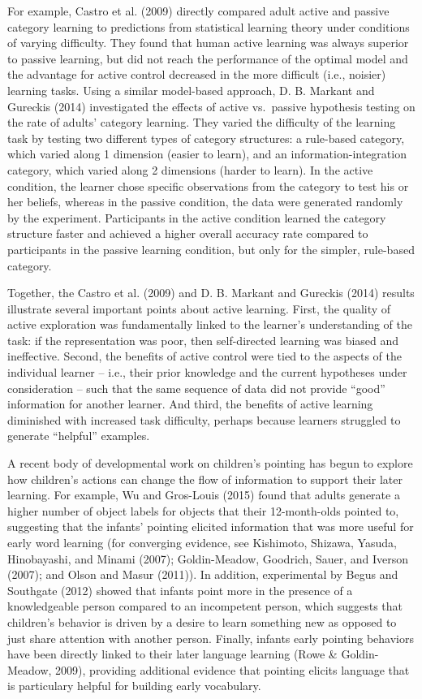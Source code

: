 \documentclass[english,man]{apa6}
\theoremstyle{definition}
\theoremstyle{definition}
\theoremstyle{definition}
\theoremstyle{remark}
\begin{document}
For example, Castro et al. (2009) directly compared adult active and
passive category learning to predictions from statistical learning
theory under conditions of varying difficulty. They found that human
active learning was always superior to passive learning, but did not
reach the performance of the optimal model and the advantage for active
control decreased in the more difficult (i.e., noisier) learning tasks.
Using a similar model-based approach, D. B. Markant and Gureckis (2014)
investigated the effects of active vs.~passive hypothesis testing on the
rate of adults' category learning. They varied the difficulty of the
learning task by testing two different types of category structures: a
rule-based category, which varied along 1 dimension (easier to learn),
and an information-integration category, which varied along 2 dimensions
(harder to learn). In the active condition, the learner chose specific
observations from the category to test his or her beliefs, whereas in
the passive condition, the data were generated randomly by the
experiment. Participants in the active condition learned the category
structure faster and achieved a higher overall accuracy rate compared to
participants in the passive learning condition, but only for the
simpler, rule-based category.

Together, the Castro et al. (2009) and D. B. Markant and Gureckis (2014)
results illustrate several important points about active learning.
First, the quality of active exploration was fundamentally linked to the
learner's understanding of the task: if the representation was poor,
then self-directed learning was biased and ineffective. Second, the
benefits of active control were tied to the aspects of the individual
learner -- i.e., their prior knowledge and the current hypotheses under
consideration -- such that the same sequence of data did not provide
\enquote{good} information for another learner. And third, the benefits
of active learning diminished with increased task difficulty, perhaps
because learners struggled to generate \enquote{helpful} examples.

A recent body of developmental work on children's pointing has begun to
explore how children's actions can change the flow of information to
support their later learning. For example, Wu and Gros-Louis (2015)
found that adults generate a higher number of object labels for objects
that their 12-month-olds pointed to, suggesting that the infants'
pointing elicited information that was more useful for early word
learning (for converging evidence, see Kishimoto, Shizawa, Yasuda,
Hinobayashi, and Minami (2007); Goldin-Meadow, Goodrich, Sauer, and
Iverson (2007); and Olson and Masur (2011)). In addition, experimental
by Begus and Southgate (2012) showed that infants point more in the
presence of a knowledgeable person compared to an incompetent person,
which suggests that children's behavior is driven by a desire to learn
something new as opposed to just share attention with another person.
Finally, infants early pointing behaviors have been directly linked to
their later language learning (Rowe \& Goldin-Meadow, 2009), providing
additional evidence that pointing elicits language that is particulary
helpful for building early vocabulary.
\end{document}
